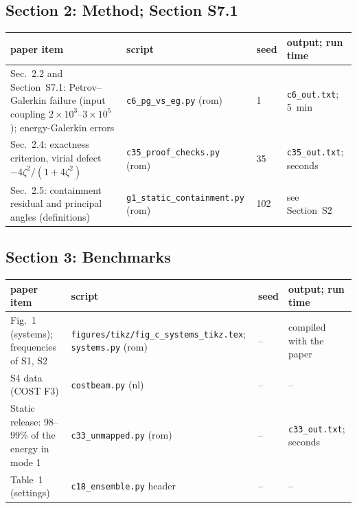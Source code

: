 \documentclass[10pt]{article}
\newcommand{\f}[1]{\texttt{#1}}
\begin{document}
\subsection*{Section 2: Method; Section S7.1}
\begin{longtable}{L{0.31\textwidth}L{0.25\textwidth}L{0.08\textwidth}L{0.25\textwidth}}
\toprule
paper item & script & seed & output; run time\\ \midrule
Sec.~2.2 and Section~S7.1: Petrov--Galerkin failure (input coupling $2\times10^3$--$3\times10^5$); energy-Galerkin errors & \f{c6\_\allowbreak{}pg\_\allowbreak{}vs\_\allowbreak{}eg.py} (rom) & 1 & \f{c6\_\allowbreak{}out.txt}; 5~min\\
Sec.~2.4: exactness criterion, virial defect $-4\zeta^2/(1+4\zeta^2)$ & \f{c35\_\allowbreak{}proof\_\allowbreak{}checks.py} (rom) & 35 & \f{c35\_\allowbreak{}out.txt}; seconds\\
Sec.~2.5: containment residual and principal angles (definitions) & \f{g1\_\allowbreak{}static\_\allowbreak{}containment.py} (rom) & 102 & see Section~S2\\
\bottomrule
\end{longtable}

\subsection*{Section 3: Benchmarks}
\begin{longtable}{L{0.31\textwidth}L{0.25\textwidth}L{0.08\textwidth}L{0.25\textwidth}}
\toprule
paper item & script & seed & output; run time\\ \midrule
Fig.~1 (systems); frequencies of S1, S2 & \f{figures/\allowbreak{}tikz/\allowbreak{}fig\_\allowbreak{}c\_\allowbreak{}systems\_\allowbreak{}tikz.tex}; \f{systems.py} (rom) & -- & compiled with the paper\\
S4 data (COST F3) & \f{costbeam.py} (nl) & -- & --\\
Static release: 98--99\% of the energy in mode 1 & \f{c33\_\allowbreak{}unmapped.py} (rom) & -- & \f{c33\_\allowbreak{}out.txt}; seconds\\
Table~1 (settings) & \f{c18\_\allowbreak{}ensemble.py} header & -- & --\\
\bottomrule
\end{longtable}
\end{document}
